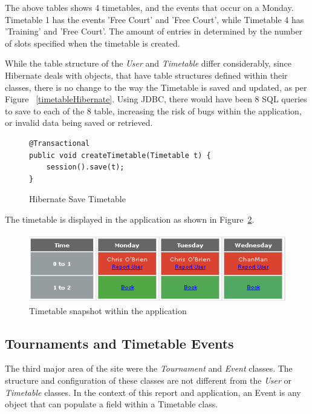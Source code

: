 The above tables shows 4 timetables, and the events that occur on a Monday. Timetable 1 has the events 'Free Court' and 'Free Court', while Timetable 4 has 'Training' and 'Free Court'. The amount of entries in determined by the number of slots specified when the timetable is created. 

While the table structure of the \textit{User} and \textit{Timetable} differ considerably, since Hibernate deals with objects, that have table structures defined within their classes, there is no change to the way the Timetable is saved and updated, as per Figure ~\ref{timetableHibernate}. Using JDBC, there would have been 8 SQL queries to save to each of the 8 table, increasing the risk of bugs within the application, or invalid data being saved or retrieved.

\begin{figure}[H]
\begin{lstlisting}
@Transactional
public void createTimetable(Timetable t) {
	session().save(t);
}
\end{lstlisting}
\caption{Hibernate Save Timetable}
\label{fig:timetableHibernate}
\end{figure}

The timetable is displayed in the application as shown in Figure~\ref{fig:timetablesite}.

\begin{figure}[H]
\begin{center}
\includegraphics[width=15cm]{timetable.png}
\end{center}
\caption{Timetable snapshot within the application}
\label{fig:timetablesite}
\end{figure}


\subsection{Tournaments and Timetable Events}

The third major area of the site were the \textit{Tournament} and \textit{Event} classes. The structure and configuration of these classes are not different from the \textit{User} or \textit{Timetable} classes. In the context of this report and application, an Event is any object that can populate a field within a Timetable class. 

